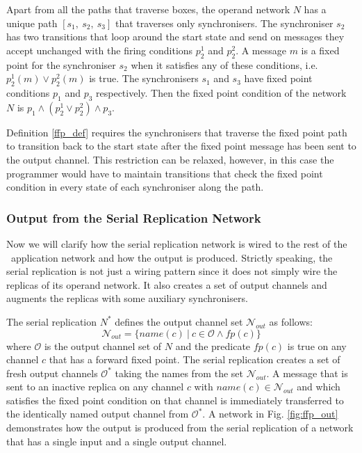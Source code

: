 Apart from all the paths that traverse boxes, the operand network $N$ has a unique path $[s_1, \: s_2, \: s_3]$ that traverses only synchronisers. The synchroniser $s_2$ has two transitions that loop around the start state and send on messages they accept unchanged with the firing conditions $p^{1}_2$ and $p^{2}_2$. A message $m$ is a fixed point for the synchroniser $s_2$ when it satisfies any of these conditions, i.e. $p^{1}_2(m) \lor p^{2}_2(m)$ is true. The synchronisers $s_1$ and $s_3$ have fixed point conditions $p_1$ and $p_3$ respectively. Then the fixed point condition of the network $N$ is $p_1 \land (p^{1}_2 \lor p^{2}_2) \land p_3$.

Definition \ref{ffp_def} requires the synchronisers that traverse the fixed point path to transition back to the start state after the fixed point message has been sent to the output channel. This restriction can be relaxed, however, in this case the programmer would have to maintain transitions that check the fixed point condition in every state of each synchroniser along the path.


    \subsubsection*{Output from the Serial Replication Network}
Now we will clarify how the serial replication network is wired to the rest of the \ak\ application network and how the output is produced. Strictly speaking, the serial replication is not just a wiring pattern since it does not simply wire the replicas of its operand network. It also creates a set of output channels and augments the replicas with some auxiliary synchronisers.

The serial replication $N^{*}$ defines the output channel set $\mathcal{N}_{out}$ as follows:
\begin{equation}
\mathcal{N}_{out} = \{ name(c) \: | \: c \in \mathcal{O} \land fp(c) \}\nonumber
\end{equation}
where $\mathcal{O}$ is the output channel set of $N$ and the predicate $fp(c)$ is true on any channel $c$ that has a forward fixed point. The serial replication creates a set of fresh output channels $\mathcal{O}^{*}$ taking the names from the set $\mathcal{N}_{out}$. A message that is sent to an inactive replica on any channel $c$ with $name(c) \in \mathcal{N}_{out}$ and which satisfies the fixed point condition on that channel is immediately transferred to the identically named output channel from $\mathcal{O}^{*}$. A network in Fig. \ref{fig:ffp_out} demonstrates how the output is produced from the serial replication of a network that has a single input and a single output channel.

